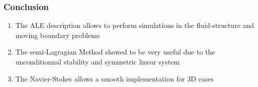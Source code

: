 
\begin{frame}
 \frametitle{\LARGE Conclusion}
 \vspace{-1cm}
\begin{enumerate}
 \justifying
 \small

 
%
%
%

 \item The ALE description allows to perform simulations in the fluid-structure and moving boundary problems\\

 \vspace{0.3cm}

 \item The semi-Lagragian Method showed to be very useful 
 due to the unconditionnal stability and symmetric linear system\\

 \vspace{0.3cm}

 \item The Navier-Stokes allows a smooth implementation for 3D cases

\end{enumerate}
\end{frame}



